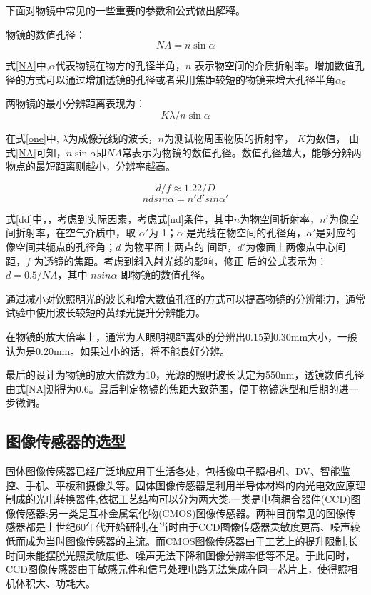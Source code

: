 下面对物镜中常见的一些重要的参数和公式做出解释。

物镜的数值孔径：
\begin{equation}
\label{NA}
\mathit{NA} = n\sin \alpha 
\end{equation}

式\ref{NA}中,$\alpha$代表物镜在物方的孔径半角，$n$ 表示物空间的介质折射率。增加数值孔径的方式可以通过增加透镜的孔径或者采用焦距较短的物镜来增大孔径半角$\alpha$。

两物镜的最小分辨距离表现为：
\begin{equation}
\label{one}
\mathit{K}\lambda / n\sin \alpha 
\end{equation}

在式\ref{one}中, $\lambda$为成像光线的波长，$n$为测试物周围物质的折射率， $\mathit{K}$为数值， 由式\ref{NA}可知，$n\sin \alpha$即$\mathit{NA}$常表示为物镜的数值孔径。数值孔径越大，能够分辨两物点的最短距离则越小，分辨率越高。

\begin{equation}
\label{dd}
d/f \approx  1.22/D
\end{equation}
\begin{equation}
\label{nd}
ndsin \alpha=n'd'sin \alpha'
\end{equation}


式\ref{dd}中，，考虑到实际因素，考虑式\ref{nd}条件，其中$n$为物空间折射率，$n'$为像空间折射率，在空气介质中，取 $\alpha'$为 1；$\alpha$ 是光线在物空间的孔径角，$\alpha'$是对应的像空间共轭点的孔径角；$d$ 为物平面上两点的 间距，$d'$为像面上两像点中心间距，$f$ 为透镜的焦距。考虑到斜入射光线的影响，修正 后的公式表示为：$d=0.5/NA$，其中 $nsin\alpha$ 即物镜的数值孔径。 

通过减小对饮照明光的波长和增大数值孔径的方式可以提高物镜的分辨能力，通常试验中使用波长较短的黄绿光提升分辨能力。

在物镜的放大倍率上，通常为人眼明视距离处的分辨出0.15到0.30mm大小，一般认为是0.20mm。如果过小的话，将不能良好分辨。

最后的设计为物镜的放大倍数为10，光源的照明波长认定为550nm，透镜数值孔径由式\ref{NA}测得为0.6。最后判定物镜的焦距大致范围，便于物镜选型和后期的进一步微调。

\subsection{图像传感器的选型}
固体图像传感器已经广泛地应用于生活各处，包括像电子照相机、DV、智能监控、手机、平板和摄像头等。固体图像传感器是利用半导体材料的内光电效应原理制成的光电转换器件,依据工艺结构可以分为两大类:一类是电荷耦合器件(CCD)图像传感器;另一类是互补金属氧化物(CMOS)图像传感器。两种目前常见的图像传感器都是上世纪60年代开始研制,在当时由于CCD图像传感器灵敏度更高、噪声较低而成为当时图像传感器的主流。而CMOS图像传感器由于工艺上的提升限制,长时间未能摆脱光照灵敏度低、噪声无法下降和图像分辨率低等不足。于此同时，CCD图像传感器由于敏感元件和信号处理电路无法集成在同一芯片上，使得照相机体积大、功耗大\cite{CCDCMOSf}。

